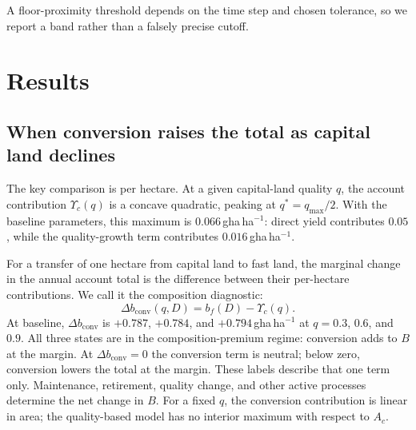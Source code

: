 \documentclass[preprint,12pt,authoryear]{elsarticle}
\newcommand{\dconv}{\Delta b_{\mathrm{conv}}}
\newcommand{\Ups}{\Upsilon_c}
\begin{document}
A floor-proximity threshold depends on the time step and chosen tolerance, so we report a band rather than a falsely precise cutoff.
\section{Results}\label{sec:results}

\subsection{When conversion raises the total as capital land declines}\label{sec:mask}

The key comparison is per hectare. At a given capital-land quality $q$, the account contribution $\Ups(q)$ is a concave quadratic, peaking at $q^*=q_{\max}/2$. With the baseline parameters, this maximum is $0.066$\,gha\,ha$^{-1}$: direct yield contributes $0.05$, while the quality-growth term contributes $0.016$\,gha\,ha$^{-1}$.

For a transfer of one hectare from capital land to fast land, the marginal change in the annual account total is the difference between their per-hectare contributions. We call it the composition diagnostic:
\begin{equation}\label{eq:dconv}
\dconv(q,D)=b_f(D)-\Ups(q).
\end{equation}
At baseline, $\dconv$ is $+0.787$, $+0.784$, and $+0.794$\,gha\,ha$^{-1}$ at $q=0.3$, $0.6$, and $0.9$. All three states are in the composition-premium regime: conversion adds to $B$ at the margin. At $\dconv=0$ the conversion term is neutral; below zero, conversion lowers the total at the margin. These labels describe that one term only. Maintenance, retirement, quality change, and other active processes determine the net change in $B$. For a fixed $q$, the conversion contribution is linear in area; the quality-based model has no interior maximum with respect to $A_c$.
\end{document}
